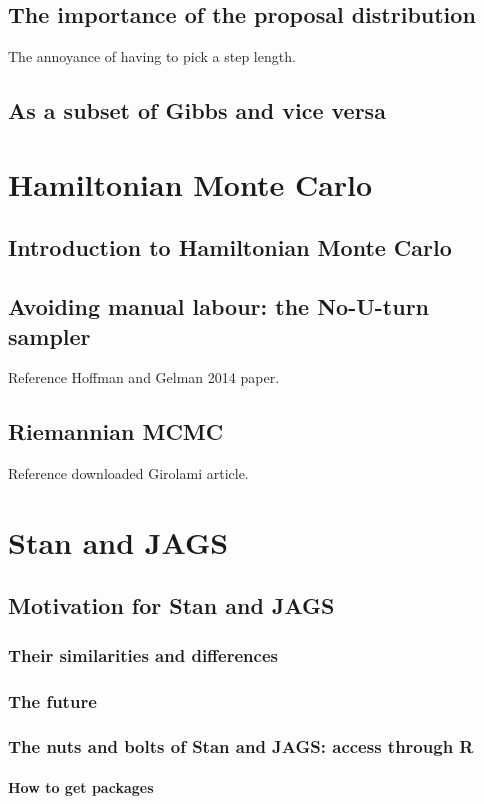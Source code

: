 \documentclass[11pt,fullpage]{book}
\begin{document}
\section{The importance of the proposal distribution}
The annoyance of having to pick a step length.

\section{As a subset of Gibbs and vice versa}

\chapter{Hamiltonian Monte Carlo}
\section{Introduction to Hamiltonian Monte Carlo}
\section{Avoiding manual labour: the No-U-turn sampler}
Reference Hoffman and Gelman 2014 paper.
\section{Riemannian MCMC}
Reference downloaded Girolami article.

\chapter{Stan and JAGS}
\section{Motivation for Stan and JAGS}
\subsection{Their similarities and differences}
\subsection{The future}

\subsection{The nuts and bolts of Stan and JAGS: access through R}
\subsubsection{How to get packages}
\end{document}
